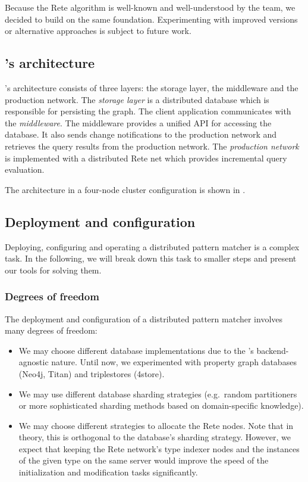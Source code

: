 Because the Rete algorithm is well-known and well-understood by the \eiq{} team, we decided to build \iqd{} on the same foundation. Experimenting with improved versions or alternative approaches is subject to future work.

\subsection{\iqd{}'s architecture}

\iqd{}'s architecture consists of three layers: the storage layer, the middleware and the production network. 
The \emph{storage layer} is a distributed database which is responsible for persisting the graph. 
The client application communicates with the \emph{middleware}. The middleware provides a unified API for accessing the database. It also sends change notifications to the production network and retrieves the query results from the production network. 
The \emph{production network} is implemented with a distributed Rete net which provides incremental query evaluation. 


The \iqd{} architecture in a four-node cluster configuration is shown in .


\subsection{Deployment and configuration}
\label{subsec:deployment-configuration}

Deploying, configuring and operating a distributed pattern matcher is a complex task. In the following, we will break down this task to smaller steps and present our tools for solving them.

\subsubsection{Degrees of freedom}

The deployment and configuration of a distributed pattern matcher involves many degrees of freedom:

\begin{itemize}
  \item We may choose different database implementations due to the \iqd{}'s backend-agnostic nature. Until now, we experimented with property graph databases (Neo4j, Titan) and triplestores (4store).
  \item We may use different database sharding strategies (e.g.\ random partitioners or more sophisticated sharding methods based on domain-specific knowledge).
  \item We may choose different strategies to allocate the Rete nodes. Note that in theory, this is orthogonal to the database's sharding strategy. However, we expect that keeping the Rete network's type indexer nodes and the instances of the given type on the same server would improve the speed of the initialization and modification tasks significantly.
\end{itemize}
 
